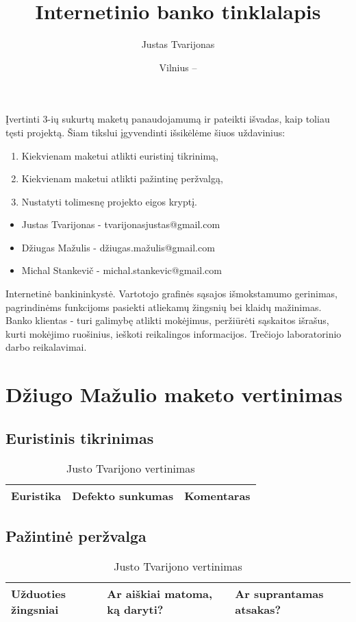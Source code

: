 \documentclass[oneside]{VUMIFPSkursinis}
\title{Internetinio banko tinklalapis}
\author{Justas Tvarijonas}
\date{Vilnius – \the\year}
\begin{document}
\maketitle
{}
Įvertinti 3-ių sukurtų maketų panaudojamumą ir pateikti išvadas, kaip toliau tęsti projektą. Šiam tikslui įgyvendinti išsikėlėme šiuos uždavinius:
\begin{enumerate}
	\item Kiekvienam maketui atlikti euristinį tikrinimą,
	\item Kiekvienam maketui atlikti pažintinę peržvalgą,
	\item Nustatyti tolimesnę projekto eigos kryptį.
\end{enumerate}
\begin{itemize}
	\item Justas Tvarijonas - tvarijonasjustas@gmail.com
	\item Džiugas Mažulis - džiugas.mažulis@gmail.com
	\item Michal Stankevič - michal.stankevic@gmail.com 
\end{itemize}
\tableofcontents
{}
Internetinė bankininkystė.
Vartotojo grafinės sąsajos išmokstamumo gerinimas, pagrindinėms funkcijoms pasiekti atliekamų žingsnių bei klaidų mažinimas.
Banko klientas - turi galimybę atlikti mokėjimus, peržiūrėti sąskaitos išrašus, kurti mokėjimo ruošinius, ieškoti reikalingos informacijos.
Trečiojo laboratorinio darbo reikalavimai.
\section{Džiugo Mažulio maketo vertinimas}
\subsection{Euristinis tikrinimas}
\begin{center}
	\begin{table}[h]
\begin{tabular}{|p{3cm}|p{4cm}|p{8.1cm}|}
  \hline
  Euristika & Defekto sunkumas & Komentaras \\ \hline
\end{tabular}
\caption{Justo Tvarijono vertinimas}
\end{table}
\end{center}
\subsection{Pažintinė peržvalga}
\begin{center}
\begin{table}[h]
\begin{tabular}{|p{5cm}|p{5cm}|p{5cm}|}
	\hline
	Užduoties žingsniai & Ar aiškiai matoma, ką daryti? & Ar suprantamas atsakas? \\ \hline
\end{tabular}
\caption{Justo Tvarijono vertinimas}
\end{table}
\end{center}
\end{document}
